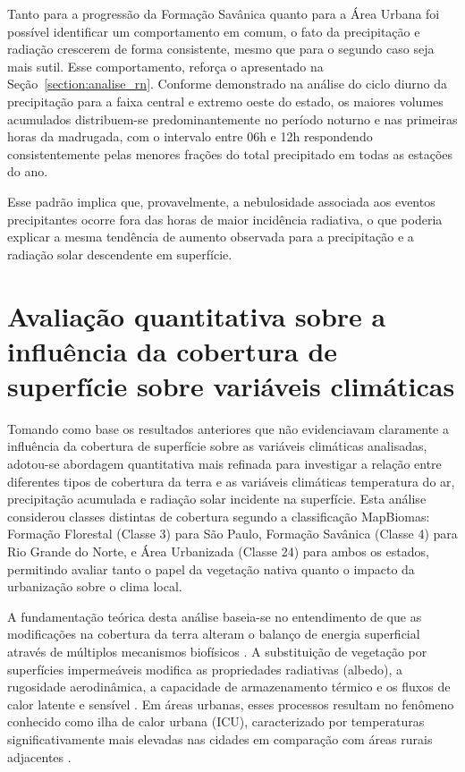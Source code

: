 Tanto para a progressão da Formação Savânica quanto para a Área Urbana foi possível identificar um comportamento em comum, o fato da precipitação e radiação crescerem de forma consistente, mesmo que para o segundo caso seja mais sutil. Esse comportamento, reforça o apresentado na Seção~\ref{section:analise_rn}. Conforme demonstrado na análise do ciclo diurno da precipitação para a faixa central e extremo oeste do estado, os maiores volumes acumulados distribuem-se predominantemente no período noturno e nas primeiras horas da madrugada, com o intervalo entre 06h e 12h respondendo consistentemente pelas menores frações do total precipitado em todas as estações do ano. 

Esse padrão implica que, provavelmente, a nebulosidade associada aos eventos precipitantes ocorre fora das horas de maior incidência radiativa, o que poderia explicar a mesma tendência de aumento observada para a precipitação e a radiação solar descendente em superfície.

\section{Avaliação quantitativa sobre a influência da cobertura de superfície sobre variáveis climáticas}

Tomando como base os resultados anteriores que não evidenciavam claramente a influência da cobertura de superfície sobre as variáveis climáticas analisadas, adotou-se abordagem quantitativa mais refinada para investigar a relação entre diferentes tipos de cobertura da terra e as variáveis climáticas temperatura do ar, precipitação acumulada e radiação solar incidente na superfície. Esta análise considerou classes distintas de cobertura segundo a classificação MapBiomas: Formação Florestal (Classe 3) para São Paulo, Formação Savânica (Classe 4) para Rio Grande do Norte, e Área Urbanizada (Classe 24) para ambos os estados, permitindo avaliar tanto o papel da vegetação nativa quanto o impacto da urbanização sobre o clima local.

A fundamentação teórica desta análise baseia-se no entendimento de que as modificações na cobertura da terra alteram o balanço de energia superficial através de múltiplos mecanismos biofísicos \citep{oke1982energetic}. A substituição de vegetação por superfícies impermeáveis modifica as propriedades radiativas (albedo), a rugosidade aerodinâmica, a capacidade de armazenamento térmico e os fluxos de calor latente e sensível \citep{arnfield2003two}. Em áreas urbanas, esses processos resultam no fenômeno conhecido como ilha de calor urbana (ICU), caracterizado por temperaturas significativamente mais elevadas nas cidades em comparação com áreas rurais adjacentes \citep{voogt2003thermal}.

